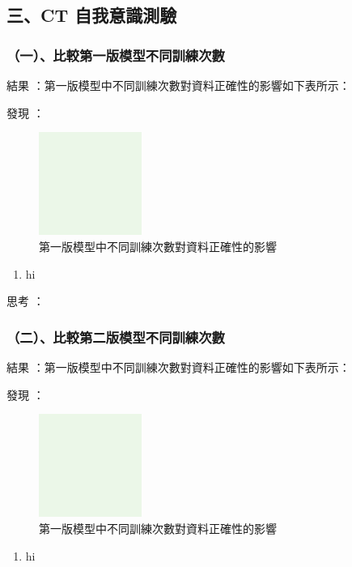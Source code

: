 \documentclass[8pt,a4paper,MingLiU,UTF8]{article}
\def\xeCJKembold{0.4}
\def\saveCJKnode{\dimen255\lastkern}
\def\restoreCJKnode{\kern-\dimen255\kern\dimen255}
\let\CJKoldsymbol\CJKsymbol
\let\CJKoldpunctsymbol\CJKpunctsymbol
\def\CJKfakeboldsymbol#1{%
	\special{pdf:literal direct 2 Tr \xeCJKembold\space w}%
	\CJKoldsymbol{#1}%
	\saveCJKnode
	\special{pdf:literal direct 0 Tr}%
	\restoreCJKnode}
\def\CJKfakeboldpunctsymbol#1{%
	\special{pdf:literal direct 2 Tr \xeCJKembold\space w}%
	\CJKoldpunctsymbol{#1}%
	\saveCJKnode
	\special{pdf:literal direct 0 Tr}%
	\restoreCJKnode}
\newcommand\CJKfakebold[1]{%
	\let\CJKsymbol\CJKfakeboldsymbol
	\let\CJKpunctsymbol\CJKfakeboldpunctsymbol
	#1%
	\let\CJKsymbol\CJKoldsymbol
	\let\CJKpunctsymbol\CJKoldpunctsymbol}
\begin{document}
	\subsection{三、CT 自我意識測驗}
	\subsubsection{（一）、比較第一版模型不同訓練次數}
		\CJKfakebold{結果}：第一版模型中不同訓練次數對資料正確性的影響如下表所示：
	
	\CJKfakebold{發現}：
	\begin{figure}
		\centering
		\includegraphics[width=0.3\textwidth]{dummy}
		\caption{第一版模型中不同訓練次數對資料正確性的影響}
	\end{figure}
	\begin{enumerate}
		\item hi
	\end{enumerate}
	
	\CJKfakebold{思考}：
	
\subsubsection{（二）、比較第二版模型不同訓練次數}
	\CJKfakebold{結果}：第一版模型中不同訓練次數對資料正確性的影響如下表所示：

\CJKfakebold{發現}：
\begin{figure}
	\centering
	\includegraphics[width=0.3\textwidth]{dummy}
	\caption{第一版模型中不同訓練次數對資料正確性的影響}
\end{figure}
\begin{enumerate}
	\item hi
\end{enumerate}
\end{document}
